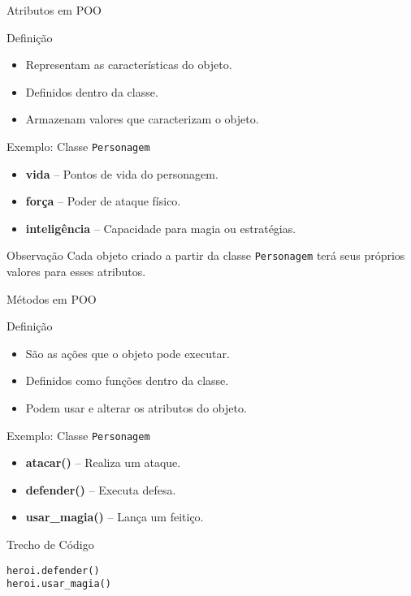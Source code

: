 \begin{frame}{Atributos em POO}

\begin{block}{Definição}
\begin{itemize}
    \item Representam as características do objeto.
    \item Definidos dentro da classe.
    \item Armazenam valores que caracterizam o objeto.
\end{itemize}
\end{block}

\begin{exampleblock}{Exemplo: Classe \texttt{Personagem}}
\begin{itemize}
    \item \textbf{vida} – Pontos de vida do personagem.
    \item \textbf{força} – Poder de ataque físico.
    \item \textbf{inteligência} – Capacidade para magia ou estratégias.
\end{itemize}
\end{exampleblock}

\begin{block}{Observação}
Cada objeto criado a partir da classe \texttt{Personagem} terá seus próprios valores para esses atributos.
\end{block}

\end{frame}

\begin{frame}[fragile]{Métodos em POO}

\begin{block}{Definição}
\begin{itemize}
    \item São as ações que o objeto pode executar.
    \item Definidos como funções dentro da classe.
    \item Podem usar e alterar os atributos do objeto.
\end{itemize}
\end{block}

\begin{exampleblock}{Exemplo: Classe \texttt{Personagem}}
\begin{itemize}
    \item \textbf{atacar()} – Realiza um ataque.
    \item \textbf{defender()} – Executa defesa.
    \item \textbf{usar\_magia()} – Lança um feitiço.
\end{itemize}
\end{exampleblock}

\begin{exampleblock}{Trecho de Código}
\begin{verbatim}
heroi.defender()
heroi.usar_magia()
\end{verbatim}
\end{exampleblock}

\end{frame}

